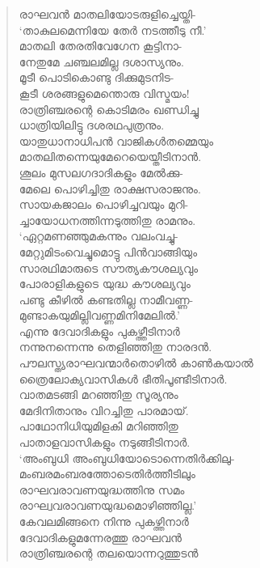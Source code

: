 \begin{verse}
രാഘവന്‍ മാതലിയോടരുളിച്ചെയ്തി-\\
‘താകുലമെന്നിയേ തേര്‍ നടത്തീടു നീ.’\\
മാതലി തേരതിവേഗേന കൂട്ടിനാ-\\
നേതുമേ ചഞ്ചലമില്ല ദശാസ്യനും.\\
മൂടീ പൊടികൊണ്ടു ദിക്കുമുടനിട-\\
കൂടീ ശരങ്ങളുമെന്തൊരു വിസ്മയം!\\
രാത്രിഞ്ചരന്റെ കൊടിമരം ഖണ്ഡിച്ചു\\
ധാത്രിയിലിട്ടു ദശരഥപുത്രനും.\\
യാതുധാനാധിപന്‍ വാജികള്‍തമ്മെയും\\
മാതലിതന്നെയുമേറെയെയ്തീടിനാന്‍.\\
ശൂലം മുസലഗദാദികളും മേല്‍ക്കു-\\
മേലെ പൊഴിച്ചിതു രാക്ഷസരാജനും.\\
സായകജാലം പൊഴിച്ചവയും മുറി-\\
ച്ചായോധനത്തിന്നടുത്തിതു രാമനും.\\
‘ഏറ്റമണഞ്ഞുമകന്നും വലംവച്ചു-\\
മേറ്റുമിടംവെച്ചുമൊട്ടു പിന്‍വാങ്ങിയും\\
സാരഥിമാരുടെ സൗത്യകൗശല്യവും\\
പോരാളികളുടെ യുദ്ധ കൗശല്യവും\\
പണ്ടു കീഴില്‍ കണ്ടതില്ല നാമീവണ്ണ-\\
മുണ്ടാകയുമില്ലിവണ്ണമിനിമേലില്‍.’\\
എന്നു ദേവാദികളും പുകഴ്ത്തീടിനാര്‍\\
നന്നുനന്നെന്നു തെളിഞ്ഞിതു നാരദന്‍.\\
പൗലസ്ത്യരാഘവന്മാര്‍‍തൊഴില്‍ കാണ്‍കയാല്‍\\
ത്രൈലോക്യവാസികള്‍ ഭീതിപൂണ്ടീടിനാര്‍.\\
വാതമടങ്ങി മറഞ്ഞിതു സൂര്യനും\\
മേദിനിതാനും വിറച്ചിതു പാരമായ്.\\
പാഥോനിധിയുമിളകി മറിഞ്ഞിതു\\
പാതാളവാസികളും നടുങ്ങീടിനാര്‍.\\
‘അംബുധി അംബുധിയോടൊന്നെതിര്‍ക്കിലു-\\
മംബരമംബരത്തോടെതിര്‍ത്തീടിലും\\
രാഘവരാവണയുദ്ധത്തിനു സമം\\
രാഘ്വവരാവണയുദ്ധമൊഴിഞ്ഞില്ല.’\\
കേവലമിങ്ങനെ നിന്നു പുകഴ്ത്തിനാര്‍\\
ദേവാദികളുമന്നേരത്തു രാഘവന്‍\\
രാത്രിഞ്ചരന്റെ തലയൊന്നറുത്തുടന്‍\\

\end{verse}
